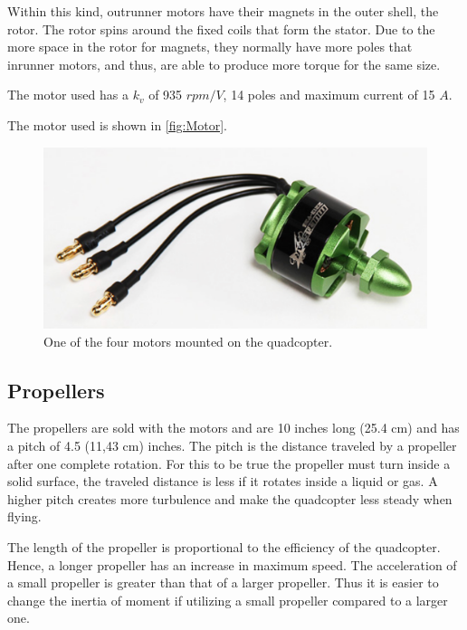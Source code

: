 Within this kind, outrunner motors have their magnets in the outer shell, the rotor. The rotor spins around the fixed coils that form the stator. Due to the more space in the rotor for magnets, they normally have more poles that inrunner motors, and thus, are able to produce more torque for the same size.  

The motor used has a $k_v$ of 935 $rpm/V$, 14 poles and maximum current of 15 $A$. 

The motor used is shown in \autoref{fig:Motor}.
\begin{figure}[H]
	\centering
	\includegraphics[scale=0.5]{figures/motor.png}
	\caption{One of the four motors mounted on the quadcopter.}
	\label{fig:Motor}
\end{figure} 


\subsection{Propellers}
The propellers are sold with the motors and are 10 inches long (25.4 cm) and has a pitch of 4.5 (11,43 cm) inches. The pitch is the distance traveled by a propeller after one complete rotation. For this to be true the propeller must turn inside a solid surface, the traveled distance is less if it rotates inside a liquid or gas.  A higher pitch creates more turbulence and make the quadcopter less steady when flying. 

The length of the propeller is proportional to the efficiency of the quadcopter. Hence, a longer propeller has an increase in maximum speed. The acceleration of a small propeller is greater than that of a larger propeller. Thus it is easier to change the inertia of moment if utilizing a small propeller compared to a larger one.  

